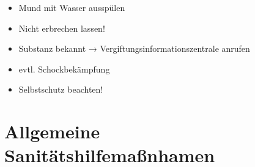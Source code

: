 { 
\begin{itemize}
    \item Mund mit Wasser ausspülen
    \item Nicht erbrechen lassen!
    \item Substanz bekannt → Vergiftungsinformationszentrale anrufen
    \item evtl. Schockbekämpfung
    \item Selbstschutz beachten!
\end{itemize}
}
























\chapter{Allgemeine Sanitätshilfemaßnhamen}

